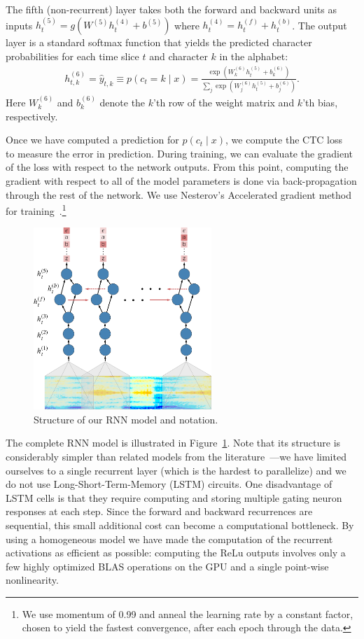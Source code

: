 The fifth (non-recurrent) layer takes both the forward and backward units as
inputs $h^{(5)}_t = g(W^{(5)} h^{(4)}_t + b^{(5)})$ where $h^{(4)}_t =
h^{(f)}_t + h^{(b)}_t$. The output layer is a standard softmax function that
yields the predicted character probabilities for each time slice $t$ and
character $k$ in the alphabet:
\begin{align*}
    h_{t,k}^{(6)} = \hat{y}_{t,k} \equiv p(c_t = k \mid x) =
        \frac{\exp(W_k^{(6)} h_t^{(5)}+b_k^{(6)})}{\sum_j \exp(W_j^{(6)} h_t^{(5)}+b_j^{(6)})}.
\end{align*}
Here $W_k^{(6)}$ and $b_k^{(6)}$ denote the $k$'th row of the weight matrix and
$k$'th bias, respectively.  

Once we have computed a prediction for $p(c_t \mid x)$, we compute the CTC
loss~\cite{graves2006} to measure the error in prediction. During training, we
can evaluate the gradient of the loss with respect to the network outputs. From
this point, computing the gradient with respect to all of the model parameters
is done via back-propagation through the rest of the network. We use Nesterov's
Accelerated gradient method for training~\cite{sutskever2013}.\footnote{We use
momentum of 0.99 and anneal the learning rate by a constant factor, chosen to
yield the fastest convergence, after each epoch through the data.}

\begin{figure}[th]
\centering
 \includegraphics[width=0.6\textwidth]{deepspeech/figures/speech_network.pdf}
  \caption{Structure of our RNN model and notation.}
  \label{fig:deepspeech:rnn}
\end{figure}

The complete RNN model is illustrated in Figure~\ref{fig:deepspeech:rnn}. Note
that its structure is considerably simpler than related models from the
literature~\cite{graves2014}---we have limited ourselves to a single recurrent
layer (which is the hardest to parallelize) and we do not use
Long-Short-Term-Memory (LSTM) circuits. One disadvantage of LSTM cells is that
they require computing and storing multiple gating neuron responses at each
step. Since the forward and backward recurrences are sequential, this small
additional cost can become a computational bottleneck. By using a homogeneous
model we have made the computation of the recurrent activations as efficient as
possible: computing the ReLu outputs involves only a few highly optimized BLAS
operations on the GPU and a single point-wise nonlinearity.

